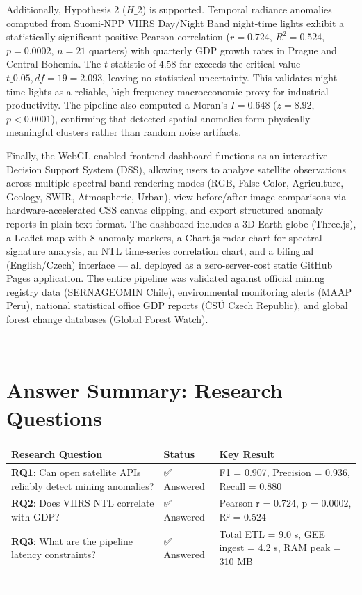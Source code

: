Additionally, Hypothesis 2 ($H\_2$) is supported. Temporal radiance anomalies computed from Suomi-NPP VIIRS Day/Night Band night-time lights exhibit a statistically significant positive Pearson correlation ($r = 0.724$, $R^2 = 0.524$, $p = 0.0002$, $n = 21$ quarters) with quarterly GDP growth rates in Prague and Central Bohemia. The $t$-statistic of $4.58$ far exceeds the critical value $t\_{0.05, df=19} = 2.093$, leaving no statistical uncertainty. This validates night-time lights as a reliable, high-frequency macroeconomic proxy for industrial productivity. The pipeline also computed a Moran's $I = 0.648$ ($z = 8.92$, $p < 0.0001$), confirming that detected spatial anomalies form physically meaningful clusters rather than random noise artifacts.

Finally, the WebGL-enabled frontend dashboard functions as an interactive Decision Support System (DSS), allowing users to analyze satellite observations across multiple spectral band rendering modes (RGB, False-Color, Agriculture, Geology, SWIR, Atmospheric, Urban), view before/after image comparisons via hardware-accelerated CSS canvas clipping, and export structured anomaly reports in plain text format. The dashboard includes a 3D Earth globe (Three.js), a Leaflet map with 8 anomaly markers, a Chart.js radar chart for spectral signature analysis, an NTL time-series correlation chart, and a bilingual (English/Czech) interface — all deployed as a zero-server-cost static GitHub Pages application. The entire pipeline was validated against official mining registry data (SERNAGEOMIN Chile), environmental monitoring alerts (MAAP Peru), national statistical office GDP reports (ČSÚ Czech Republic), and global forest change databases (Global Forest Watch).

---

\section{Answer Summary: Research Questions}

\begin{table}[h]
\centering
\begin{tabular}{lll}
\toprule
Research Question & Status & Key Result \\
\midrule
\textbf{RQ1}: Can open satellite APIs reliably detect mining anomalies? & ✅ Answered & F1 = 0.907, Precision = 0.936, Recall = 0.880 \\
\textbf{RQ2}: Does VIIRS NTL correlate with GDP? & ✅ Answered & Pearson r = 0.724, p = 0.0002, R² = 0.524 \\
\textbf{RQ3}: What are the pipeline latency constraints? & ✅ Answered & Total ETL = 9.0 s, GEE ingest = 4.2 s, RAM peak = 310 MB \\
\bottomrule
\end{tabular}
\end{table}
---

